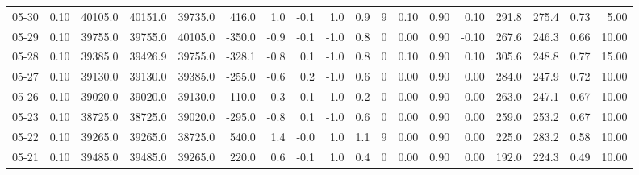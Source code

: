 \begin{threeparttable}
{\begin{tabular}{lrrrrrrrrrrrrrrrrr}
  05-30 &     0.10 & 40105.0 & 40151.0 & 39735.0 &      416.0 &            1.0 &                      -0.1 &                      1.0 &                 0.9 &              9 &       0.10 &      0.90 &           0.10 &            291.8 &               275.4 &            0.73 &                   5.00 \\
  05-29 &     0.10 & 39755.0 & 39755.0 & 40105.0 &     -350.0 &           -0.9 &                      -0.1 &                     -1.0 &                 0.8 &              0 &       0.00 &      0.90 &          -0.10 &            267.6 &               246.3 &            0.66 &                  10.00 \\
  05-28 &     0.10 & 39385.0 & 39426.9 & 39755.0 &     -328.1 &           -0.8 &                       0.1 &                     -1.0 &                 0.8 &              0 &       0.10 &      0.90 &           0.10 &            305.6 &               248.8 &            0.77 &                  15.00 \\
  05-27 &     0.10 & 39130.0 & 39130.0 & 39385.0 &     -255.0 &           -0.6 &                       0.2 &                     -1.0 &                 0.6 &              0 &       0.00 &      0.90 &           0.00 &            284.0 &               247.9 &            0.72 &                  10.00 \\
  05-26 &     0.10 & 39020.0 & 39020.0 & 39130.0 &     -110.0 &           -0.3 &                       0.1 &                     -1.0 &                 0.2 &              0 &       0.00 &      0.90 &           0.00 &            263.0 &               247.1 &            0.67 &                  10.00 \\
  05-23 &     0.10 & 38725.0 & 38725.0 & 39020.0 &     -295.0 &           -0.8 &                       0.1 &                     -1.0 &                 0.6 &              0 &       0.00 &      0.90 &           0.00 &            259.0 &               253.2 &            0.67 &                  10.00 \\
  05-22 &     0.10 & 39265.0 & 39265.0 & 38725.0 &      540.0 &            1.4 &                      -0.0 &                      1.0 &                 1.1 &              9 &       0.00 &      0.90 &           0.00 &            225.0 &               283.2 &            0.58 &                  10.00 \\
  05-21 &     0.10 & 39485.0 & 39485.0 & 39265.0 &      220.0 &            0.6 &                      -0.1 &                      1.0 &                 0.4 &              0 &       0.00 &      0.90 &           0.00 &            192.0 &               224.3 &            0.49 &                  10.00 \\

\end{tabular}}
\end{threeparttable}
